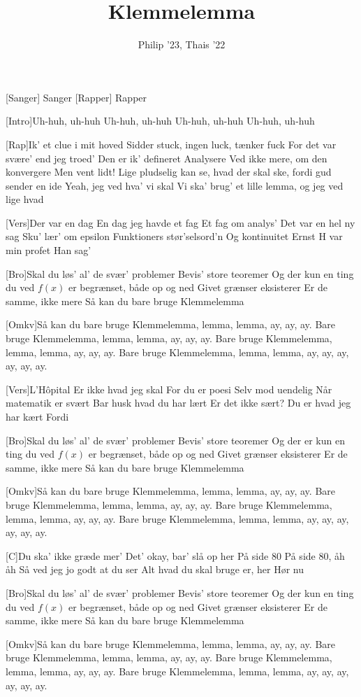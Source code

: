 \documentclass[a4paper,11pt]{article}
\title{Klemmelemma}
\author{Philip '23, Thais '22}
\begin{document}
\maketitle

\begin{roles}
[Sanger] Sanger
[Rapper] Rapper
\end{roles}

\begin{song}
    [Intro]Uh-huh, uh-huh
Uh-huh, uh-huh
Uh-huh, uh-huh
Uh-huh, uh-huh

    [Rap]Ik' et clue i mit hoved
Sidder stuck, ingen luck, tænker fuck
For det var svære' end jeg troed'
Den er ik' defineret 
Analysere
Ved ikke mere, om den konvergere
Men vent lidt!
Lige pludselig kan se, hvad der skal ske, fordi gud sender en ide
Yeah, jeg ved hva' vi skal
Vi ska' brug' et lille lemma, og jeg ved lige hvad 

    [Vers]Der var en dag
En dag jeg havde et fag
Et fag om analys'
Det var en hel ny sag
Sku' lær' om epsilon
Funktioners stør'selsord'n
Og kontinuitet
Ernst H var min profet
Han sag'

    [Bro]Skal du løs' al' de svær' problemer 
Bevis' store teoremer 
Og der kun en ting du ved
$f(x)$ er begrænset, både op og ned
Givet grænser eksisterer
Er de samme, ikke mere
Så kan du bare bruge Klemmelemma

    [Omkv]Så kan du bare bruge Klemmelemma, lemma, lemma, ay, ay, ay.
Bare bruge Klemmelemma, lemma, lemma, ay, ay, ay.
Bare bruge Klemmelemma, lemma, lemma, ay, ay, ay.
Bare bruge Klemmelemma, lemma, lemma, ay, ay, ay, ay, ay, ay.

    [Vers]L'Hôpital
Er ikke hvad jeg skal
For du er poesi
Selv mod uendelig
Når matematik er svært
Bar husk hvad du har lært 
Er det ikke sært?
Du er hvad jeg har kært 
Fordi

    [Bro]Skal du løs' al' de svær' problemer 
Bevis' store teoremer 
Og der er kun en ting du ved
$f(x)$ er begrænset, både op og ned
Givet grænser eksisterer
Er de samme, ikke mere
Så kan du bare bruge Klemmelemma

    [Omkv]Så kan du bare bruge Klemmelemma, lemma, lemma, ay, ay, ay.
Bare bruge Klemmelemma, lemma, lemma, ay, ay, ay.
Bare bruge Klemmelemma, lemma, lemma, ay, ay, ay.
Bare bruge Klemmelemma, lemma, lemma, ay, ay, ay, ay, ay, ay.

    [C]Du ska' ikke græde mer'
Det' okay, bar' slå op her
På side $80$
På side $80$, åh åh 
Så ved jeg jo godt at du ser
Alt hvad du skal bruge er, her
Hør nu

    [Bro]Skal du løs' al' de svær' problemer 
Bevis' store teoremer 
Og der kun en ting du ved
$f(x)$ er begrænset, både op og ned
Givet grænser eksisterer
Er de samme, ikke mere
Så kan du bare bruge Klemmelemma

    [Omkv]Så kan du bare bruge Klemmelemma, lemma, lemma, ay, ay, ay.
Bare bruge Klemmelemma, lemma, lemma, ay, ay, ay.
Bare bruge Klemmelemma, lemma, lemma, ay, ay, ay.
Bare bruge Klemmelemma, lemma, lemma, ay, ay, ay, ay, ay, ay.
    
\end{song}
\end{document}
